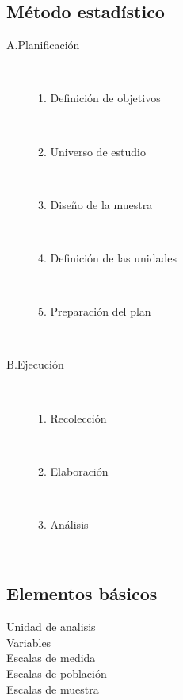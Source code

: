 \documentclass[10pt,letterpaper,oneside]{report}
\begin{document}
  \subsection{Método estadístico}
    \begin{description}
      \item[A.Planificación] \hfill \\
        \begin{description}
          \item[1. Definición de objetivos] \hfill \\
          \item[2. Universo de estudio] \hfill \\
          \item[3. Diseño de la muestra] \hfill \\
          \item[4. Definición de las unidades] \hfill \\
          \item[5. Preparación del plan] \hfill \\
        \end{description}
      \item[B.Ejecución] \hfill \\
        \begin{description}
          \item[1. Recolección] \hfill \\
          \item[2. Elaboración] \hfill \\
          \item[3. Análisis] \hfill \\
        \end{description}
    \end{description}

  \subsection{Elementos básicos}
    \begin{description}
      \item[Unidad de analisis]
      \item[Variables]
      \item[Escalas de medida]
      \item[Escalas de población]
      \item[Escalas de muestra]
    \end{description}
\end{document}
